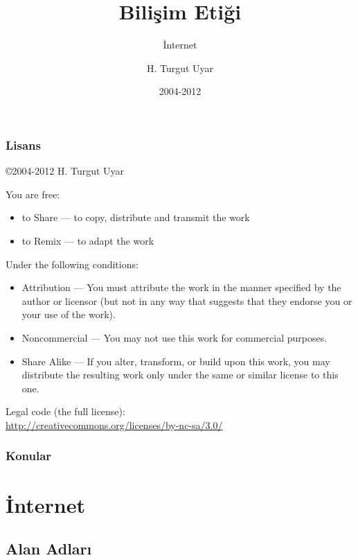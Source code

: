 \documentclass[dvipsnames]{beamer}
\title{Bilişim Etiği}
\subtitle{İnternet}
\author{H. Turgut Uyar}
\date{2004-2012}
\theoremstyle{definition}
\theoremstyle{example}
\theoremstyle{plain}
\begin{document}
\begin{frame}
  \titlepage
\end{frame}

\begin{frame}
  \frametitle{Lisans}

  \hfill
  \copyright 2004-2012 H. Turgut Uyar

  \vfill
  \begin{tiny}
    You are free:
    \begin{itemize}
      \item to Share — to copy, distribute and transmit the work
      \item to Remix — to adapt the work
    \end{itemize}

    Under the following conditions:
    \begin{itemize}
      \item Attribution — You must attribute the work in the manner specified by
        the author or licensor (but not in any way that suggests that they
        endorse you or your use of the work).

      \item Noncommercial — You may not use this work for commercial purposes.

      \item Share Alike — If you alter, transform, or build upon this work, you
        may distribute the resulting work only under the same or similar license
        to this one.
    \end{itemize}
  \end{tiny}

  \vfill
  Legal code (the full license):\\
  \url{http://creativecommons.org/licenses/by-nc-sa/3.0/}
\end{frame}

\begin{frame}
  \frametitle{Konular}
  \tableofcontents
\end{frame}

\section{İnternet}

\subsection{Alan Adları}
\end{document}
